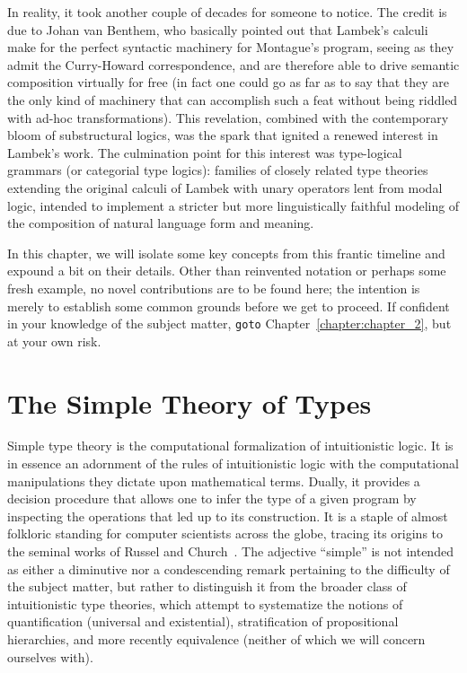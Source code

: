 In reality, it took another couple of decades for someone to notice.
The credit is due to Johan van Benthem, who basically pointed out that Lambek's calculi make for the perfect syntactic machinery for Montague's program, seeing as they admit the Curry-Howard correspondence, and are therefore able to drive semantic composition virtually for free (in fact one could go as far as to say that they are the only kind of machinery that can accomplish such a feat without being riddled with ad-hoc transformations).
This revelation, combined with the contemporary bloom of substructural logics, was the spark that ignited a renewed interest in Lambek's work.
The culmination point for this interest was type-logical grammars (or categorial type logics): families of closely related type theories extending the original calculi of Lambek with unary operators lent from modal logic, intended to implement a stricter but more linguistically faithful modeling of the composition of natural language form and meaning.

In this chapter, we will isolate some key concepts from this frantic timeline and expound a bit on their details.
Other than reinvented notation or perhaps some fresh example, no novel contributions are to be found here; the intention is merely to establish some common grounds before we get to proceed. 
If confident in your knowledge of the subject matter, \texttt{goto} Chapter~\ref{chapter:chapter_2}, but at your own risk.


\section{The Simple Theory of Types}\label{section:simple_type_theory}

Simple type theory is the computational formalization of intuitionistic logic. 
It is in essence an adornment of the rules of intuitionistic logic with the computational manipulations they dictate upon mathematical terms.
Dually, it provides a decision procedure that allows one to infer the type of a given program by inspecting the operations that led up to its construction.
It is a staple of almost folkloric standing for computer scientists across the globe, tracing its origins to the seminal works of Russel and Church~\cite{russel1908,church1940}.
The adjective ``simple'' is not intended as either a diminutive nor a condescending remark pertaining to the difficulty of the subject matter, but rather to distinguish it from the broader class of intuitionistic type theories, which attempt to systematize the notions of quantification (universal and existential), stratification of propositional hierarchies, and more recently equivalence (neither of which we will concern ourselves with).

